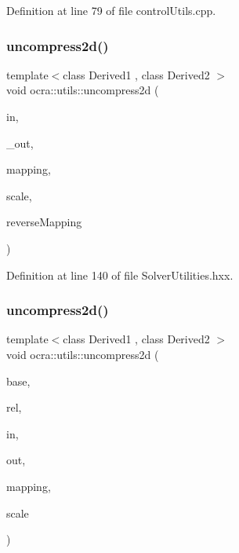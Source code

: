 Definition at line 79 of file control\+Utils.\+cpp.

\hypertarget{namespaceocra_1_1utils_a6336653c4ed344718fdf1c888c668a58}{}\label{namespaceocra_1_1utils_a6336653c4ed344718fdf1c888c668a58} 
\subsubsection{\texorpdfstring{uncompress2d()}{uncompress2d()}\hspace{0.1cm}{\footnotesize\ttfamily [1/2]}}
{\footnotesize\ttfamily template$<$class Derived1 , class Derived2 $>$ \\
void ocra\+::utils\+::uncompress2d (\begin{DoxyParamCaption}\item[{const Matrix\+Base$<$ Derived1 $>$ \&}]{in,  }\item[{Matrix\+Base$<$ Derived2 $>$ const \&}]{\+\_\+out,  }\item[{const std\+::vector$<$ int $>$ \&}]{mapping,  }\item[{double}]{scale,  }\item[{bool}]{reverse\+Mapping }\end{DoxyParamCaption})\hspace{0.3cm}{\ttfamily [inline]}}



Definition at line 140 of file Solver\+Utilities.\+hxx.

\hypertarget{namespaceocra_1_1utils_a5189699a011acaa6413bd14c178254c3}{}\label{namespaceocra_1_1utils_a5189699a011acaa6413bd14c178254c3} 
\subsubsection{\texorpdfstring{uncompress2d()}{uncompress2d()}\hspace{0.1cm}{\footnotesize\ttfamily [2/2]}}
{\footnotesize\ttfamily template$<$class Derived1 , class Derived2 $>$ \\
void ocra\+::utils\+::uncompress2d (\begin{DoxyParamCaption}\item[{const \hyperlink{classocra_1_1Variable}{Variable} \&}]{base,  }\item[{const \hyperlink{classocra_1_1Variable}{Variable} \&}]{rel,  }\item[{const Matrix\+Base$<$ Derived1 $>$ \&}]{in,  }\item[{Matrix\+Base$<$ Derived2 $>$ const \&}]{out,  }\item[{std\+::vector$<$ int $>$ \&}]{mapping,  }\item[{double}]{scale }\end{DoxyParamCaption})\hspace{0.3cm}{\ttfamily [inline]}}



